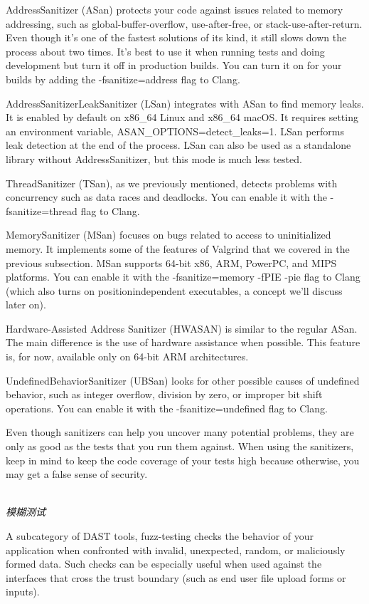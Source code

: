 AddressSanitizer (ASan) protects your code against issues related to memory addressing, such as global-buffer-overflow, use-after-free, or stack-use-after-return. Even though it's one of the fastest solutions of its kind, it still slows down the process about two times. It's best to use it when running tests and doing development but turn it off in production builds. You can turn it on for your builds by adding the -fsanitize=address flag to Clang.

AddressSanitizerLeakSanitizer (LSan) integrates with ASan to find memory leaks. It is enabled by default on x86\_64 Linux and x86\_64 macOS. It requires setting an environment variable, ASAN\_OPTIONS=detect\_leaks=1. LSan performs leak detection at the end of the process. LSan can also be used as a standalone library without AddressSanitizer, but this mode is much less tested.

ThreadSanitizer (TSan), as we previously mentioned, detects problems with concurrency such as data races and deadlocks. You can enable it with the -fsanitize=thread flag to Clang.

MemorySanitizer (MSan) focuses on bugs related to access to uninitialized memory. It implements some of the features of Valgrind that we covered in the previous subsection. MSan supports 64-bit x86, ARM, PowerPC, and MIPS platforms. You can enable it with the -fsanitize=memory -fPIE -pie flag to Clang (which also turns on positionindependent executables, a concept we'll discuss later on).

Hardware-Assisted Address Sanitizer (HWASAN) is similar to the regular ASan. The main difference is the use of hardware assistance when possible. This feature is, for now, available only on 64-bit ARM architectures.

UndefinedBehaviorSanitizer (UBSan) looks for other possible causes of undefined behavior, such as integer overflow, division by zero, or improper bit shift operations. You can enable it with the -fsanitize=undefined flag to Clang.

Even though sanitizers can help you uncover many potential problems, they are only as good as the tests that you run them against. When using the sanitizers, keep in mind to keep the code coverage of your tests high because otherwise, you may get a false sense of security.

\hspace*{\fill} \\ %
\noindent
\textit{模糊测试}

A subcategory of DAST tools, fuzz-testing checks the behavior of your application when confronted with invalid, unexpected, random, or maliciously formed data. Such checks can be especially useful when used against the interfaces that cross the trust boundary (such as end user file upload forms or inputs).

